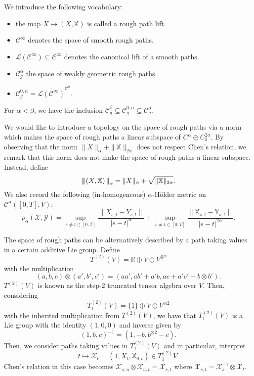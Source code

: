 \documentclass[]{article}
\theoremstyle{definition}
\theoremstyle{definition}
\newcommand{\vertiii}[1]{{\left\vert\kern-0.25ex\left\vert\kern-0.25ex\left\vert #1 
    \right\vert\kern-0.25ex\right\vert\kern-0.25ex\right\vert}}
\begin{document}
We introduce the following vocabulary:
\begin{itemize}
  \item the map \(X \mapsto (X, \mathbb{X})\) is called a rough path lift.
  \item \(\mathcal{C}^\infty\) denotes the space of smooth rough paths.
  \item \(\mathcal{L}(\mathcal{C}^\infty) \subseteq \mathcal{C}^\infty\) denotes the canonical lift of a smooth paths.
  \item \(\mathcal{C}^\alpha_g\) the space of weakly geometric rough paths.
  \item \(\mathcal{C}^{0, \alpha}_g = \overline{\mathcal{L}(\mathcal{C}^\infty)}^{\mathcal{C}^\alpha}\).
\end{itemize}

For \(\alpha < \beta\), we have the inclusion \(\mathcal{C}^\beta_g \subseteq \mathcal{C}^{0, \alpha}_g \subseteq \mathcal{C}^\alpha_g\).

We would like to introduce a topology on the space of rough paths via a norm which makes the space of rough paths 
a linear subspace of \(C^\alpha \oplus C_2^{2\alpha}\). By observing that the norm \(\|X\|_{\alpha} + \|\mathbb{X}\|_{2\alpha}\)
does not respect Chen's relation, we remark that this norm does not make the space of rough paths a linear subspace. 
Instead, define 
\[\vertiii{(X, \mathbb{X})}_\alpha = \|X\|_\alpha + \sqrt{\|\mathbb{X}\|_{2\alpha}}.\]
We also record the following (in-homogeneous) \(\alpha\)-H\"older metric on \(\mathcal{C}^\alpha([0, T], V)\):
\[\rho_\alpha(\mathcal{X}, \mathcal{Y}) = \sup_{s \neq t \in [0, T]}\frac{\|X_{s, t} - Y_{s, t}\|}{|s - t|^\alpha} + 
  \sup_{s \neq t \in [0, T]}\frac{\|\mathbb{X}_{s, t} - \mathbb{Y}_{s, t}\|}{|s - t|^{2\alpha}}.\]


The space of rough paths can be alternatively described by a path taking values in a certain additive Lie group. 
Define 
\[T^{(2)}(V) = \mathbb{R} \oplus V \oplus V^{\otimes 2}\]
with the multiplication 
\[(a, b, c) \otimes (a', b', c') = (aa', ab' + a'b, ac + a'c' + b \otimes b').\]
\(T^{(2)}(V)\) is known as the step-2 truncated tensor algebra over \(V\). Then, considering 
\[T^{(2)}_1(V) = \{1\} \oplus V \oplus V^{\otimes 2}\]
with the inherited multiplication from \(T^{(2)}(V)\), we have that \(T^{(2)}_1(V)\) is a Lie group 
with the identity \((1, 0, 0)\) and inverse given by 
\[(1, b, c)^{-1} = (1, -b, b^{\otimes 2} - c).\]
Then, we consider paths taking values in \(T^{(2)}_1(V)\) and in particular, interpret 
\[t \mapsto \mathcal{X}_t = (1, X_t, \mathbb{X}_{0, t}) \in T^{(2)}_1{V}.\]
Chen's relation in this case becomes \(\mathcal{X}_{s, u} \otimes \mathcal{X}_{u, t} = \mathcal{X}_{s, t}\) 
where \(\mathcal{X}_{s, t} = \mathcal{X}_{s}^{-1} \otimes \mathcal{X}_t\).
\end{document}
